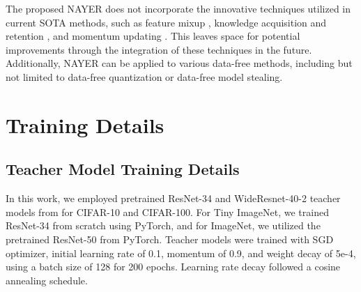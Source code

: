 \documentclass{article} %
\begin{document}
The proposed NAYER does not incorporate the innovative techniques utilized in current SOTA methods, such as feature mixup \citep{spshnet}, knowledge acquisition and retention \citep{kakr}, and momentum updating \citep{mad}. This leaves space for potential improvements through the integration of these techniques in the future. Additionally, NAYER can be applied to various data-free methods, including but not limited to data-free quantization or data-free model stealing.

\clearpage



\clearpage
\appendix
\section{Training Details}
\subsection{Teacher Model Training Details}

In this work, we employed pretrained ResNet-34 and WideResnet-40-2 teacher models from \citep{fastdfkd} for CIFAR-10 and CIFAR-100. For Tiny ImageNet, we trained ResNet-34 from scratch using PyTorch, and for ImageNet, we utilized the pretrained ResNet-50 from PyTorch. Teacher models were trained with SGD optimizer, initial learning rate of 0.1, momentum of 0.9, and weight decay of 5e-4, using a batch size of 128 for 200 epochs. Learning rate decay followed a cosine annealing schedule.
\end{document}
